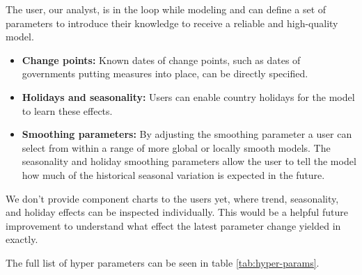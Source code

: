 The user, our analyst, is in the loop while modeling and can define a set of parameters to introduce their knowledge to receive a reliable and high-quality model.

\begin{itemize}
    \item \textbf{Change points:} Known dates of change points, such as dates of governments putting measures into place, can be directly specified.
    \item \textbf{Holidays and seasonality:} Users can enable country holidays for the model to learn these effects.
    \item \textbf{Smoothing parameters:} By adjusting the smoothing parameter a user can select from within a range of more global or locally smooth models. The seasonality and holiday smoothing parameters allow the user to tell the model how much of the historical seasonal variation is expected in the future.
\end{itemize}

We don't provide component charts to the users yet, where trend, seasonality, and holiday effects can be inspected individually. This would be a helpful future improvement to understand what effect the latest parameter change yielded in exactly. 

The full list of hyper parameters can be seen in table \ref{tab:hyper-params}.

